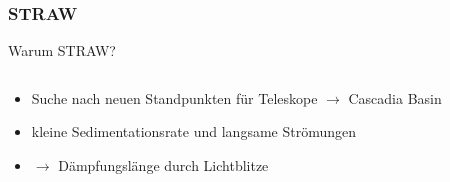 \documentclass[aspectratio=1610, 9pt]{beamer}
\begin{document}
\begin{frame}\frametitle{STRAW}
  \begin{block}{Warum STRAW?}
    \begin{columns}
    \begin{column}[c]{0.45\textwidth}
      \begin{itemize}
        \item Suche nach neuen Standpunkten f\"ur Teleskope $\to$ Cascadia Basin
        \item kleine Sedimentationsrate und langsame Str\"omungen
        \item $\to$ D\"ampfungsl\"ange durch Lichtblitze
      \end{itemize}
    \end{column}
    \begin{column}[c]{0.45\textwidth}
    \end{column}
    \end{columns}
  \end{block}
\end{frame}
\end{document}
